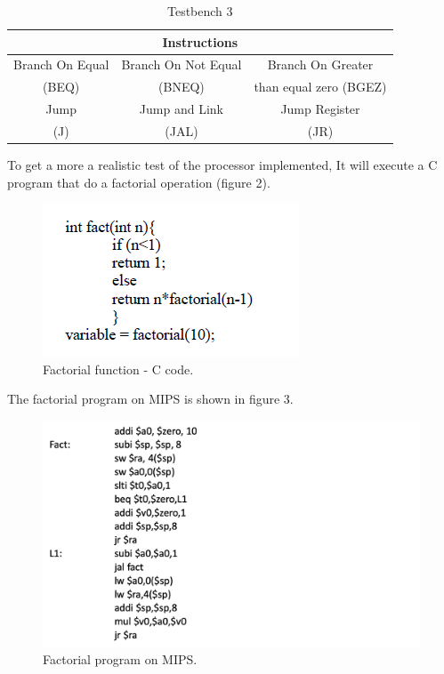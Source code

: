 \documentclass[conference]{IEEEtran}
\begin{document}
\begin{table}[htbp]
\caption{Testbench 3} %
\begin{center}
\begin{tabular}{|c|c|c|}
\hline
\multicolumn{3}{|c|}{\textbf{Instructions}} \\
\hline
Branch On Equal&Branch On Not Equal&Branch On Greater \\
(BEQ)&(BNEQ)&than equal zero (BGEZ)  \\
\hline
Jump&Jump and Link&Jump Register\\
(J)&(JAL)&(JR) \\
\hline
\end{tabular}
\label{tab_test3}
\end{center}
\end{table}

To get a more a realistic test of the processor implemented, It will execute a C program that do a factorial operation (figure 2).
\begin{figure}[h]
\begin{center}
\includegraphics[scale=0.8]{factorial_c.png}
\caption{Factorial function - C code.}
\label{fact_c}
\end{center}
\end{figure}

The factorial program on MIPS is shown in figure 3.
\begin{figure}[h]
\begin{center}
\includegraphics[scale=0.45]{MIPS_Factorial.png}
\caption{Factorial program on MIPS.}
\label{fact_mips}
\end{center}
\end{figure}
 
\end{document}
